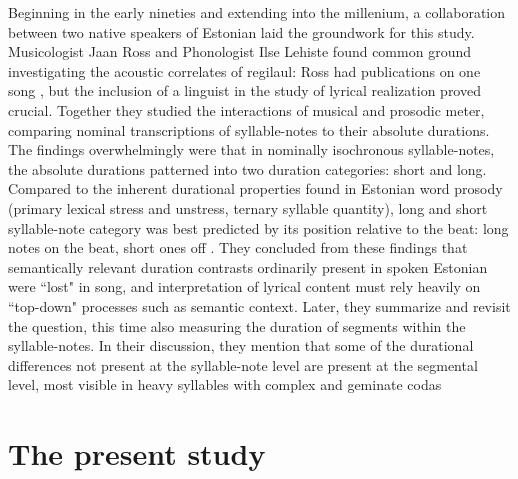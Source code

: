 %



Beginning in the early nineties and extending into the millenium, a collaboration between two native speakers of Estonian laid the groundwork for this study. Musicologist Jaan Ross and Phonologist Ilse Lehiste found common ground investigating the acoustic correlates of regilaul: Ross had publications on one song \cite{ross1989, ross1992}, but the inclusion of a linguist in the study of lyrical realization proved crucial. Together they studied the interactions of musical and prosodic meter, comparing nominal transcriptions of syllable-notes to their absolute durations. The findings overwhelmingly were that in nominally isochronous syllable-notes, the absolute durations patterned into two duration categories: short and long. Compared to the inherent durational properties found in Estonian word prosody (primary lexical stress and unstress, ternary syllable quantity), long and short syllable-note category was best predicted by its position relative to the beat: long notes on the beat, short ones off \citep{rossLehiste1994, rossLehiste1996,rossLehiste1998}. They concluded from these findings that semantically relevant duration contrasts ordinarily present in spoken Estonian were ``lost" in song, and interpretation of lyrical content must rely heavily on ``top-down" processes such as semantic context. Later, they summarize and revisit the question, this time also measuring the duration of segments within the syllable-notes.  In their discussion, they mention that some of the durational differences not present at the syllable-note level are present at the segmental level, most visible in heavy syllables with complex and geminate codas \citep{rossLehiste2001}


\section{The present study}


